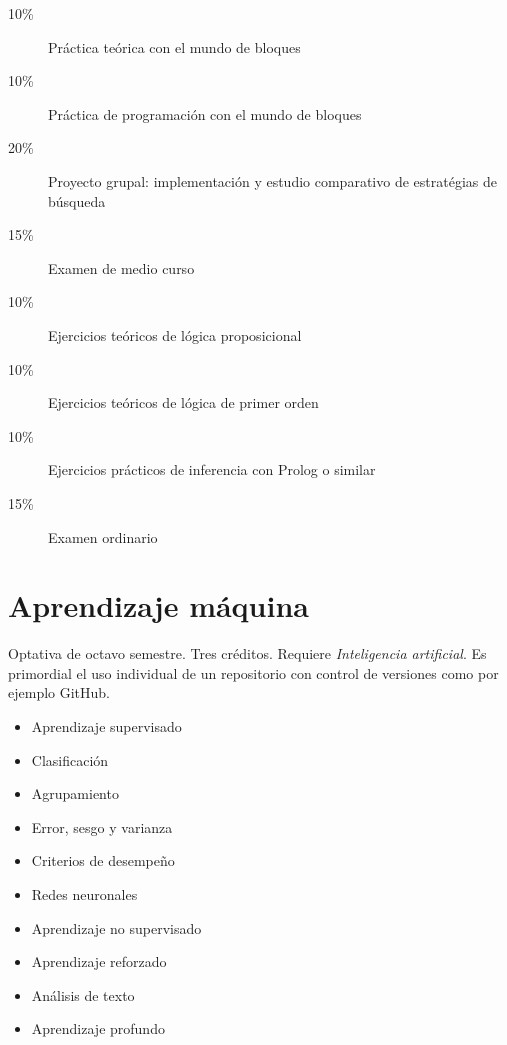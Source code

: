 \documentclass{article}
\begin{document}
\begin{multicols}{4}
\begin{description}
\item[10\%]{Pr\'{a}ctica te\'{o}rica con el mundo de bloques}
\item[10\%]{Pr\'{a}ctica de programaci\'{o}n con el mundo de bloques}
\item[20\%]{Proyecto grupal: implementaci\'{o}n y estudio comparativo de
  estrat\'{e}gias de b\'{u}squeda}
\item[15\%]{Examen de medio curso}  
\item[10\%]{Ejercicios te\'{o}ricos de l\'{o}gica proposicional}
\item[10\%]{Ejercicios te\'{o}ricos de l\'{o}gica de primer orden}  
\item[10\%]{Ejercicios pr\'{a}cticos de inferencia con Prolog o similar}  
\item[15\%]{Examen ordinario}
\end{description}  

\vfill\null \columnbreak

\hypertarget{am}{\section*{Aprendizaje m\'{a}quina}} 

Optativa de octavo semestre. Tres cr\'{e}ditos. Requiere {\em
  Inteligencia artificial}. Es primordial el uso individual de un
repositorio con control de versiones como por ejemplo GitHub.

\begin{itemize}
\item{Aprendizaje supervisado}
\item{Clasificaci\'{o}n}
\item{Agrupamiento}  
\item{Error, sesgo y varianza}
\item{Criterios de desempe\~{n}o}
\item{Redes neuronales}
\item{Aprendizaje no supervisado}
\item{Aprendizaje reforzado}  
\item{An\'{a}lisis de texto}
\item{Aprendizaje profundo}
\end{itemize}


\end{multicols}
\end{document}
